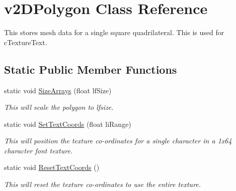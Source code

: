 \hypertarget{classv2_d_polygon}{
\section{v2DPolygon Class Reference}
\label{classv2_d_polygon}
}


This stores mesh data for a single square quadrilateral. This is used for cTextureText.  


\subsection*{Static Public Member Functions}
\begin{DoxyCompactItemize}
\item 
\hypertarget{classv2_d_polygon_a69155bd2960059119dcf2c41ffa7b387}{
static void \hyperlink{classv2_d_polygon_a69155bd2960059119dcf2c41ffa7b387}{SizeArrays} (float lfSize)}
\label{classv2_d_polygon_a69155bd2960059119dcf2c41ffa7b387}

\begin{DoxyCompactList}\small\item\em This will scale the polygon to lfsize. \end{DoxyCompactList}\item 
\hypertarget{classv2_d_polygon_a6d526372394a23288a3775a40263d93b}{
static void \hyperlink{classv2_d_polygon_a6d526372394a23288a3775a40263d93b}{SetTextCoords} (float liRange)}
\label{classv2_d_polygon_a6d526372394a23288a3775a40263d93b}

\begin{DoxyCompactList}\small\item\em This will position the texture co-\/ordinates for a single character in a 1x64 character font texture. \end{DoxyCompactList}\item 
\hypertarget{classv2_d_polygon_a78d66fe7885be81ad62c79a000dc696f}{
static void \hyperlink{classv2_d_polygon_a78d66fe7885be81ad62c79a000dc696f}{ResetTextCoords} ()}
\label{classv2_d_polygon_a78d66fe7885be81ad62c79a000dc696f}

\begin{DoxyCompactList}\small\item\em This will reset the texture co-\/ordinates to use the entire texture. \end{DoxyCompactList}\end{DoxyCompactItemize}
